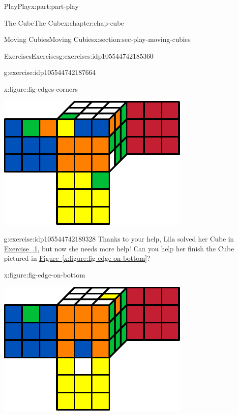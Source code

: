 \documentclass[oneside,10pt,]{book}
\newcommand{\xreffont}{\relax}
\numberwithin{equation}{section}
\begin{document}
\begin{partptx}{Play}{}{Play}{}{}{x:part:part-play}
\begin{chapterptx}{The Cube}{}{The Cube}{}{}{x:chapter:chap-cube}
\begin{sectionptx}{Moving Cubies}{}{Moving Cubies}{}{}{x:section:sec-play-moving-cubies}
\begin{exercises-subsection-numberless}{Exercises}{}{Exercises}{}{}{g:exercises:idp105544742185360}
\begin{divisionexercise}{2}{}{}{g:exercise:idp105544742187664}
\begin{figureptx}{}{x:figure:fig-edges-corners}{}
\begin{image}{0.25}{0.5}{0.25}
\includegraphics[width=\linewidth]{./images/edges-corners.pdf}
\end{image}%
\tcblower
\end{figureptx}%
\end{divisionexercise}%
\begin{divisionexercise}{3}{}{}{g:exercise:idp105544742189328}%
Thanks to your help, Lila solved her Cube in \hyperlink{x:exercise:exer-scrambled-edges}{Exercise~{\xreffont 1.3.1}}, but now she needs more help! Can you help her finish the Cube pictured in \hyperref[x:figure:fig-edge-on-bottom]{Figure~{\xreffont\ref{x:figure:fig-edge-on-bottom}}}?%
\begin{figureptx}{}{x:figure:fig-edge-on-bottom}{}%
\begin{image}{0.25}{0.5}{0.25}%
\includegraphics[width=\linewidth]{./images/edge_on_bottom.pdf}

\end{image}
\end{figureptx}
\end{divisionexercise}
\end{exercises-subsection-numberless}
\end{sectionptx}
\end{chapterptx}
\end{partptx}
\end{document}
